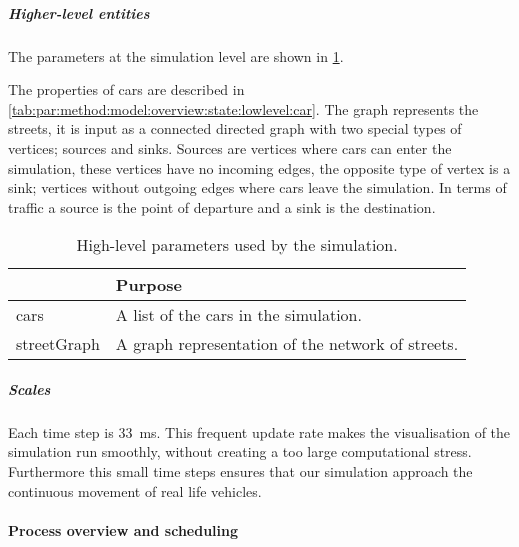 	\subparagraph{Higher-level entities}
	The parameters at the simulation level are shown in \cref{tab:par:method:model:overview:state:highlevel:sim}.

	The properties of cars are described in \cref{tab:par:method:model:overview:state:lowlevel:car}. The graph represents the streets, it is input as a connected directed graph with two special types of vertices; sources and sinks. Sources are vertices where cars can enter the simulation, these vertices have no incoming edges, the opposite type of vertex is a sink; vertices without outgoing edges where cars leave the simulation. In terms of traffic a source is the point of departure and a sink is the destination. 
	
	\begin{table}[H]
		\centering
		\begin{tabularx}{\textwidth}{>{\ttfamily}lX}
			\toprule
			\normalfont{Parameter}	& Purpose \\  
			\midrule
			cars 					& A list of the cars in the simulation. \\ 
			streetGraph		 		& A graph representation of the network of streets. \\ 
			\bottomrule
		\end{tabularx}
		\caption{High-level parameters used by the simulation.}
		\label{tab:par:method:model:overview:state:highlevel:sim}
	\end{table}


	\subparagraph{Scales}
	Each time step is \si{33 \milli\second}. This frequent update rate makes the visualisation of the simulation run smoothly, without creating a too large computational stress. Furthermore this small time steps ensures that our simulation approach the continuous movement of real life vehicles.





\paragraph{Process overview and scheduling}
\label{par:method:model:overview:process}



